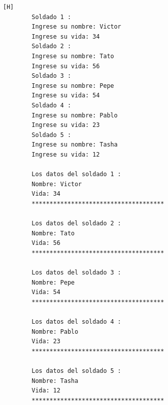 \documentclass{article}
\begin{document}
    \begin{lstlisting}[language=bash,caption={La ejecucion del codigo completo:}][H]
		Soldado 1 : 
		Ingrese su nombre: Victor
		Ingrese su vida: 34
		Soldado 2 : 
		Ingrese su nombre: Tato
		Ingrese su vida: 56
		Soldado 3 : 
		Ingrese su nombre: Pepe
		Ingrese su vida: 54
		Soldado 4 : 
		Ingrese su nombre: Pablo
		Ingrese su vida: 23
		Soldado 5 : 
		Ingrese su nombre: Tasha
		Ingrese su vida: 12
		
		Los datos del soldado 1 : 
		Nombre: Victor
		Vida: 34
		*************************************
		
		Los datos del soldado 2 : 
		Nombre: Tato
		Vida: 56
		*************************************
		
		Los datos del soldado 3 : 
		Nombre: Pepe
		Vida: 54
		*************************************
		
		Los datos del soldado 4 : 
		Nombre: Pablo
		Vida: 23
		*************************************
		
		Los datos del soldado 5 : 
		Nombre: Tasha
		Vida: 12
		*************************************

    \end{lstlisting}
\end{document}
